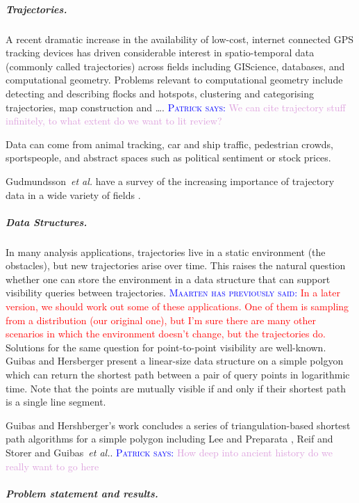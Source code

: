 \documentclass[a4paper, UKenglish]{lipics-v2018}
\newcommand{\myremark}[4]{\textcolor{blue}{\textsc{#1 #2:}} \textcolor{#4}{\textsf{#3}}}
\newcommand{\patrick}[2][says]{\myremark{Patrick}{#1}{#2}{Plum}}
\newcommand{\maarten}[2][says]{\myremark{Maarten}{#1}{#2}{Red}}
\newcommand{\etal}{\textit{et al.}\xspace}
\begin{document}
\subparagraph{Trajectories.}
A recent dramatic increase in the availability of low-cost, internet connected GPS tracking devices has driven considerable interest in spatio-temporal data (commonly called trajectories) across fields including GIScience, databases, and computational geometry. Problems relevant to computational geometry include detecting and describing flocks \cite{AnderssonGLW07, BenkertGHW08, LaubeKI04} and hotspots, clustering and categorising trajectories, map construction and \ldots.
\patrick{We can cite trajectory stuff infinitely, to what extent do we want to lit review?}

Data can come from animal tracking, car and ship traffic, pedestrian crowds, sportspeople, and abstract spaces such as political sentiment or stock prices.

Gudmundsson~\etal have a survey of the increasing importance of trajectory data in a wide variety of fields \cite{GudmundssonLW17}.

\subparagraph{Data Structures.}
In many analysis applications, trajectories live in a static environment (the obstacles), but new trajectories arise over time. This raises the natural question whether one can store the environment in a data structure that can support visibility queries between trajectories.
\maarten[has previously said]{In a later version, we should work out some of these applications. One of them is sampling from a distribution (our original one), but I'm sure there are many other scenarios in which the environment doesn't change, but the trajectories do.}
Solutions for the same question for point-to-point visibility are well-known.
Guibas and Hersberger \cite{guibas1989optimal} present a linear-size data structure on a simple polgyon which can return the shortest path between a pair of query points in logarithmic time. Note that the points are mutually visible if and only if their shortest path is a single line segment.

Guibas and Hershberger's work concludes a series of triangulation-based shortest path algorithms for a simple polygon including Lee and Preparata \cite{LeeP84}, Reif and Storer \cite{ReifS85} and Guibas~\etal \cite{GuibasHLST87}. \patrick{How deep into ancient history do we really want to go here}

\subparagraph{Problem statement and results.}
\end{document}
